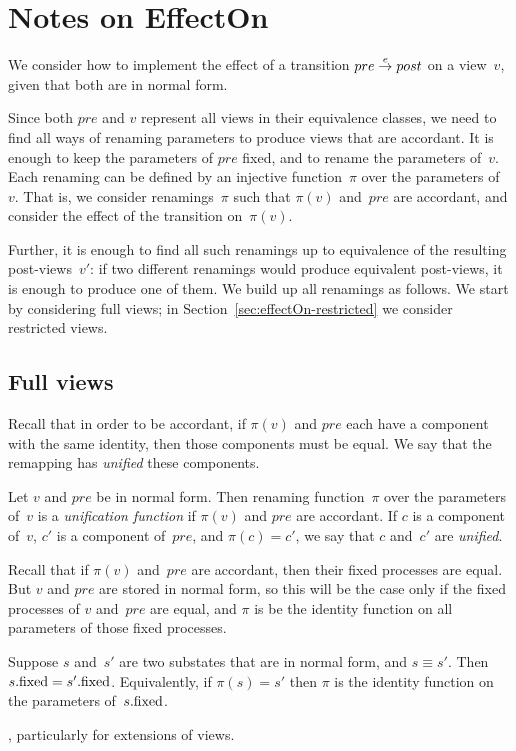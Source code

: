 \section{Notes on EffectOn}


We consider how to implement the effect of a transition $pre \stackrel{e}\rightarrow post$
on a view~$v$, given that both are in normal form. 

Since both $pre$ and $v$ represent all views in their equivalence classes, we
need to find all ways of renaming parameters to produce views that are
accordant.  It is enough to keep the parameters of $pre$ fixed, and to rename
the parameters of~$v$.  Each renaming can be defined by an injective
function~$\pi$ over the parameters of~$v$.  That is, we consider
renamings~$\pi$ such that $\pi(v)$ and~$pre$ are accordant, and consider the
effect of the transition on~$\pi(v)$.


Further, it is enough to find all such renamings up to
equivalence of the resulting post-views~$v'$: if two different renamings would
produce equivalent post-views, it is enough to produce one of them.  We build
up all renamings as follows.    We start by considering full views; in
Section~\ref{sec:effectOn-restricted} we consider restricted views.


\subsection{Full views} 

Recall that in order to be accordant, if $\pi(v)$ and $pre$ each have a
component with the same identity, then those components must be equal.  We say
that the remapping has \emph{unified} these components.
%
\begin{definition}
Let $v$ and $pre$ be in normal form.  Then renaming function~$\pi$ over the
parameters of~$v$ is a \emph{unification function} if $\pi(v)$ and $pre$ are
accordant.
%
If $c$ is a component of~$v$, $c'$ is a component of~$pre$, and $\pi(c) = c'$,
we say that $c$ and~$c'$ are \emph{unified}.
\end{definition}

Recall that if $\pi(v)$ and~$pre$ are accordant, then their fixed processes
are equal.  But $v$ and $pre$ are stored in normal form, so this will be the
case only if the fixed processes of $v$ and~$pre$ are equal, and
$\pi$ is be the identity function on all parameters of those fixed
processes.  
%
\begin{lemma}
Suppose $s$ and~$s'$ are two substates that are in normal form, and $s \equiv
s'$.  Then $s.\mathrm{fixed} = s'.\mathrm{fixed}$.  Equivalently, if $\pi(s) = s'$ then $\pi$
is the identity function on the parameters of~$s.\mathrm{fixed}$. 
\end{lemma}
%
, particularly for extensions
of views.

